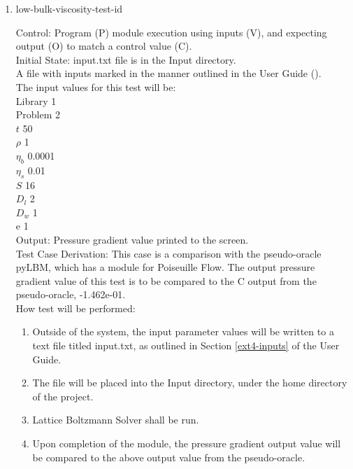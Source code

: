 \documentclass[12pt, titlepage]{article}
\newcommand{\famname}{Lattice Boltzmann Solver}
\newcounter{testcounter} %
\begin{document}
\begin{enumerate}
\item{low-bulk-viscosity-test-id\thetestcounter \\}

Control: Program (P) module execution using inputs (V), and expecting output (O) to match a control value (C).\\
					
Initial State: input.txt file is in the Input directory.\\
					
A file with inputs marked in the manner outlined in the User
Guide (\citet{LBM_UserGuide_PM}).\\The input values for this test will be:\\
Library 1\\
Problem 2\\
$t$ 50\\
$\rho$ 1\\
$\eta_b$ 0.0001\\
$\eta_s$ 0.01\\
$S$ 16\\
$D_{l}$ 2\\
$D_{w}$ 1\\
$\mathrm{e}$ 1\\

Output: Pressure gradient value printed to the screen. \\ 

Test Case Derivation: This case is a comparison with the pseudo-oracle pyLBM,
which has a module for Poiseuille Flow. The output pressure gradient value of
this test is to be compared to the C output from the pseudo-oracle,
-1.462e-01.\\

How test will be performed: 

\begin{enumerate}
\item Outside of the system, the input parameter values will be written to a text file titled input.txt, as outlined in Section \ref{ext4-inputs} of the User Guide.
\item The file will be placed into the Input directory, under the home directory
of the project.
\item {\famname} shall be run.
\item Upon completion of the module, the pressure gradient output value will be
compared to the above output value from the pseudo-oracle.
\end{enumerate}	


\end{enumerate}
\end{document}
